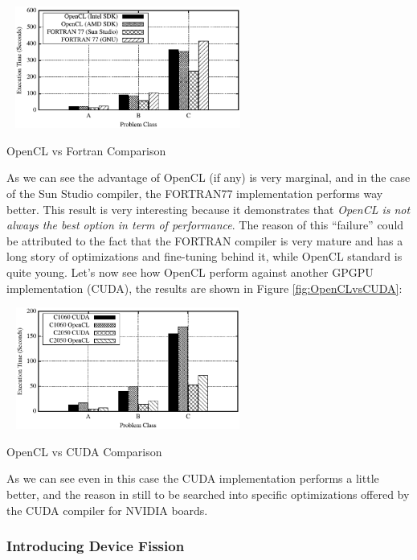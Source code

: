 \begin{figurehere}
 \centering
 \includegraphics[width=8cm, height=4cm]{./eps/OpenCLvsFORTRAN77.eps}
 \caption{OpenCL vs Fortran Comparison}
 \label{fig:OpenCLvsFORTRAN77}
\end{figurehere}

As we can see the advantage of OpenCL (if any) is very marginal, and in the case of the Sun Studio compiler, the FORTRAN77 implementation performs way better. This result is very interesting because it demonstrates that \emph{OpenCL is not always the best option in term of performance}. The reason of this ``failure'' could be attributed to the fact that the FORTRAN compiler is very mature and has a long story of optimizations and fine-tuning behind it, while OpenCL standard is quite young.
Let's now see how OpenCL perform against another GPGPU implementation (CUDA), the results are shown in Figure \ref{fig:OpenCLvsCUDA}:

\begin{figurehere}
 \centering
 \includegraphics[width=8cm, height=4cm]{./eps/OpenCLvsCUDA.eps}
 \caption{OpenCL vs CUDA Comparison}
 \label{fig:OpenCLvsCUDA}
\end{figurehere}

As we can see even in this case the CUDA implementation performs a little better, and the reason in still to be searched into specific optimizations offered by the CUDA compiler for NVIDIA boards.

\subsubsection{Introducing Device Fission}

